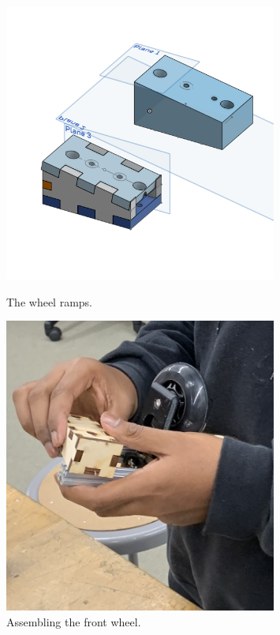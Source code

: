  

\begin{figure}[ht]
\centering
\begin{minipage}[b]{.50\textwidth}
  \centering
  \includegraphics[width=0.8\textwidth]{Meetings/October/10-11-21/10-11-21_Hardware_Figure1 - Nathan Forrer.PNG}
  \caption{The wheel ramps.}
  \label{fig:pic1}
\end{minipage}%
\hfill%
\begin{minipage}[b]{.50\textwidth}
  \centering
  \includegraphics[width=0.8\textwidth]{Meetings/October/10-11-21/10-11-21_Hardware_Figure2 - Nathan Forrer.jpg}
  \caption{Assembling the front wheel.}
  \label{fig:pic2}
\end{minipage}
\end{figure}

